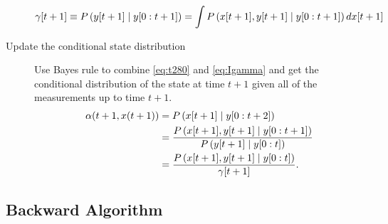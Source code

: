 \begin{description}
\begin{equation}
  \label{eq:Igamma}
  {\gamma}{[t+1]} \equiv P\left({y}{[t+1]}\mid y[0:t+1] \right) = \int
  P\left({x}{[t+1]},{y}{[t+1]}\mid y[0:t+1] \right) d{x}{[t+1]} \\
\end{equation}
\item[Update the conditional state distribution]  Use
  Bayes rule to combine \eqref{eq:t280} and \eqref{eq:Igamma} and get
  the conditional distribution of the state at time $t+1$ given all of
  the measurements up to time $t+1$.
\begin{align}
  \alpha(t+1,x(t+1)) &= P\left({x}{[t+1]}\mid y[0:t+2] \right) \\
  &=  \frac{ P\left({x}{[t+1]},{y}{[t+1]}\mid y[0:t+1]
    \right)}{P\left({y}{[t+1]}\mid y[0:t] \right)}\\
  \label{eq:IUpdate}
  &= \frac{ P\left({x}{[t+1]},{y}{[t+1]}\mid y[0:t]
    \right)}{{\gamma}{[t+1]}}.
\end{align}
\end{description}

\subsection{Backward Algorithm}

